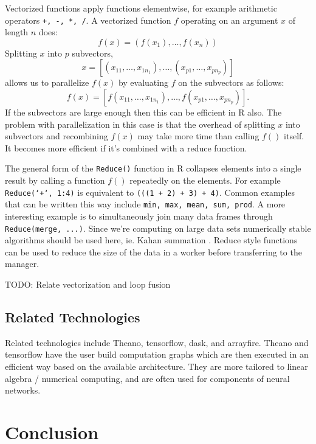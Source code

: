 \documentclass[12pt]{article}
\begin{document}
Vectorized functions apply functions elementwise, for example arithmetic
operators \texttt{+, -, *, /}. A vectorized function $f$
operating on an argument $x$ of length $n$ does:
\begin{equation}
\label{eq:vectorization}
    f(x) = (f(x_1), \dots, f(x_n))
\end{equation}
Splitting $x$ into $p$ subvectors, 
\[
    x = \left[ (x_{11}, \dots, x_{1 n_1}), \dots, (x_{p 1}, \dots, x_{p
n_p}) \right]
\]
allows us to parallelize $f(x)$ by evaluating $f$ on the subvectors as follows:
\[
    f(x) = \left[ f(x_{11}, \dots, x_{1 n_1}), \dots, f(x_{p 1}, \dots, x_{p
n_p}) \right].
\]
If the subvectors are large enough then this can be efficient in R also.
The problem with parallelization in this case is that the overhead of
splitting $x$ into subvectors and recombining $f(x)$ may take more time
than calling $f()$ itself.  It becomes more efficient if it's combined with
a reduce function.

The general form of the \texttt{Reduce()} function in R collapses elements
into a single result by calling a function $f()$ repeatedly on the
elements. For example \texttt{Reduce(`+`, 1:4)} is equivalent to
\texttt{(((1 + 2) + 3) + 4)}. Common examples that can be written this way
include \texttt{min, max, mean, sum, prod}. A more interesting example is
to simultaneously join many data frames through \texttt{Reduce(merge,
...)}.  Since we're computing on large data sets numerically stable
algorithms should be used here, ie.  Kahan summation \cite{Robey2011217}.
Reduce style functions can be used to reduce the size of the data in a
worker before transferring to the manager.

TODO: Relate vectorization and loop fusion

\subsection{Related Technologies}

Related technologies include Theano, tensorflow, dask, and arrayfire. Theano and
tensorflow have the user build computation graphs which are then executed in
an efficient way based on the available architecture. They are more
tailored to linear algebra / numerical computing, and are often used for
components of neural networks.

\section{Conclusion}
\end{document}
